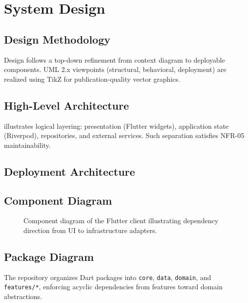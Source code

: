 \chapter{System Design}
\label{ch:design}

\section{Design Methodology}
Design follows a top-down refinement from context diagram to deployable components. UML 2.x viewpoints (structural, behavioral, deployment) are realized using TikZ for publication-quality vector graphics.

\section{High-Level Architecture}

 illustrates logical layering: presentation (Flutter widgets), application state (Riverpod), repositories, and external services. Such separation satisfies NFR-05 maintainability.

\section{Deployment Architecture}


\section{Component Diagram}
\begin{figure}[htbp]
\centering
{}
\caption{Component diagram of the Flutter client illustrating dependency direction from UI to infrastructure adapters.}
\label{fig:component_diagram}
\end{figure}

\section{Package Diagram}
The repository organizes Dart packages into \texttt{core}, \texttt{data}, \texttt{domain}, and \texttt{features/*}, enforcing acyclic dependencies from features toward domain abstractions.


